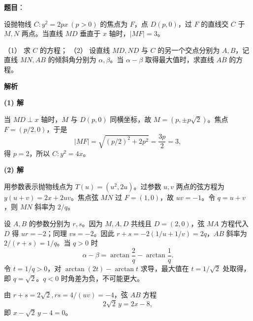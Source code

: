 \begin{answer}

\textbf{题目}：

设抛物线 $C:y^2=2px\ (p>0)$ 的焦点为 $F$，点 $D(p,0)$，过 $F$ 的直线交 $C$ 于 $M,N$ 两点。当直线 $MD$ 垂直于 $x$ 轴时，$|MF|=3$。

（1） 求 $C$ 的方程；  
（2） 设直线 $MD,ND$ 与 $C$ 的另一个交点分别为 $A,B$，记直线 $MN,AB$ 的倾斜角分别为 $\alpha,\beta$。当 $\alpha-\beta$ 取得最大值时，求直线 $AB$ 的方程。

\textbf{解析}

\textbf{(1) 解}

当 $MD\perp x$ 轴时，$M$ 与 $D(p,0)$ 同横坐标，故 $M=(p,\pm p\sqrt2)$。焦点 $F=(p/2,0)$，于是
\nopagebreak[4]
\[
|MF|=\sqrt{(p/2)^2+2p^2}=\frac{3p}{2}=3,
\]
得 $p=2$，所以 $C:y^2=4x$。

\textbf{(2) 解}

用参数表示抛物线点为 $T(u)=(u^2,2u)$。过参数 $u,v$ 两点的弦方程为 $y(u+v)=2x+2uv$。焦点弦 $MN$ 过 $F=(1,0)$，故 $uv=-1$。令 $q=u+v$，则 $MN$ 斜率为 $2/q$。

设 $A,B$ 的参数分别为 $r,s$。因为 $M,A,D$ 共线且 $D=(2,0)$，弦 $MA$ 方程代入 $D$ 得 $ur=-2$；同理 $vs=-2$。因此 $r+s=-2(1/u+1/v)=2q$，$AB$ 斜率为 $2/(r+s)=1/q$。当 $q>0$ 时
\nopagebreak[4]
\[
\alpha-\beta=\arctan\frac2q-\arctan\frac1q.
\]
令 $t=1/q>0$，对 $\arctan(2t)-\arctan t$ 求导，最大值在 $t=1/\sqrt2$ 处取得，即 $q=\sqrt2$。$q<0$ 时角差为负，不可能更大。

由 $r+s=2\sqrt2,rs=4/(uv)=-4$，弦 $AB$ 方程
\nopagebreak[4]
\[
2\sqrt2\,y=2x-8,
\]
即 $x-\sqrt2\,y-4=0$。



\end{answer}

